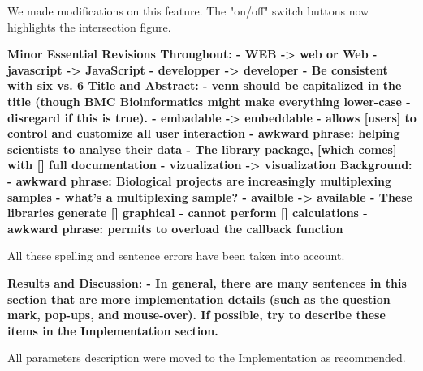\documentclass[10pt,stdletter,dateno,sigleft]{newlfm} %
\begin{document}
\begin{newlfm}
We made modifications on this feature. The "on/off" switch buttons now
highlights the intersection figure.


\textbf{Minor Essential Revisions
Throughout: \newline
- WEB -> web or Web \newline
- javascript -> JavaScript \newline
- developper -> developer \newline
- Be consistent with six vs. 6 \newline
Title and Abstract: \newline
- venn should be capitalized in the title (though BMC Bioinformatics
might make everything lower-case - disregard if this is true). \newline
- embadable -> embeddable \newline
- allows [users] to control and customize all user interaction \newline
- awkward phrase: helping scientists to analyse their data \newline 
- The library package, [which comes] with [] full documentation \newline
- vizualization -> visualization \newline
Background: \newline
- awkward phrase: Biological projects are increasingly multiplexing
samples - what's a multiplexing sample? \newline
- availble -> available \newline
- These libraries generate [] graphical \newline
- cannot perform [] calculations \newline
- awkward phrase: permits to overload the callback function \newline}

All these spelling and sentence errors have been taken into account.

\textbf{Results and Discussion:\newline
- In general, there are many sentences in this section that are more
implementation details (such as the question mark, pop-ups, and
mouse-over). If possible, try to describe these items in the
Implementation section.}

All parameters description were moved to the Implementation as recommended.


\end{newlfm}
\end{document}
